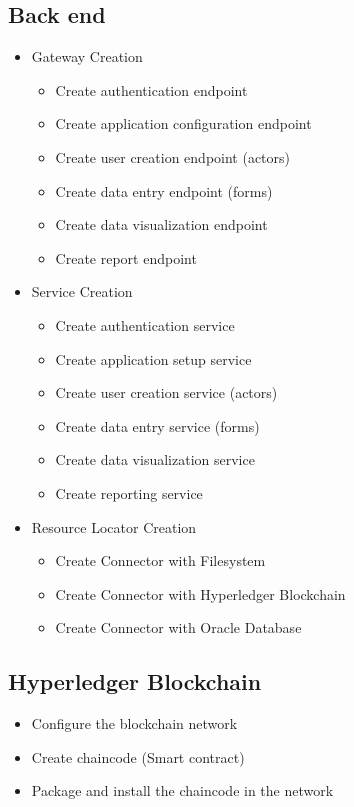 \subsection{Back end}\label{sec:BackendActivities}
\begin{itemize}
\item Gateway Creation
    \begin{itemize}
    \item Create authentication endpoint
    \item Create application configuration endpoint
    \item Create user creation endpoint (actors)
    \item Create data entry endpoint (forms)
    \item Create data visualization endpoint
    \item Create report endpoint
    \end{itemize}
\item Service Creation
    \begin{itemize}
    \item Create authentication service
    \item Create application setup service
    \item Create user creation service (actors)
    \item Create data entry service (forms)
    \item Create data visualization service
    \item Create reporting service
    \end{itemize}
\item Resource Locator Creation
    \begin{itemize}
    \item Create Connector with Filesystem
    \item Create Connector with Hyperledger Blockchain
    \item Create Connector with Oracle Database
    \end{itemize}
\end{itemize}

\subsection{Hyperledger Blockchain}\label{sec:HyperledgerBlockchain}
\begin{itemize}
\item Configure the blockchain network
\item Create chaincode (Smart contract)
\item Package and install the chaincode in the network
\end{itemize}
